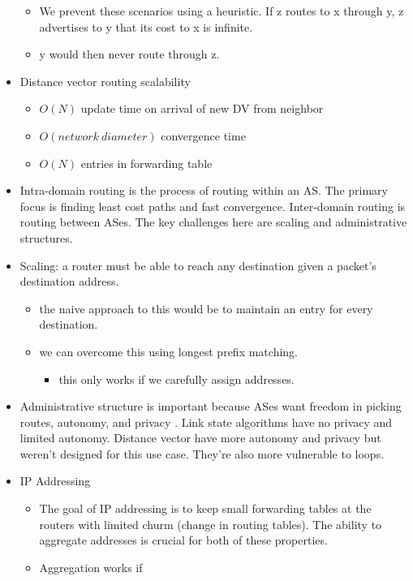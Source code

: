 \begin{itemize}
  \begin{itemize}
  \tightlist
  \item
    We prevent these scenarios using a heuristic. If z routes to x
    through y, z advertises to y that its cost to x is infinite.
  \item
    y would then never route through z.
  \end{itemize}
\item
  Distance vector routing scalability

  \begin{itemize}
  \tightlist
  \item
    \(O(N)\) update time on arrival of new DV from neighbor
  \item
    \(O(network \ diameter)\) convergence time
  \item
    \(O(N)\) entries in forwarding table
  \end{itemize}
\item
  Intra-domain routing is the process of routing within an AS. The
  primary focus is finding least cost paths and fast convergence.
  Inter-domain routing is routing between ASes. The key challenges here
  are scaling and administrative structures.
\item
  Scaling: a router must be able to reach any destination given a
  packet's destination address.

  \begin{itemize}
  \tightlist
  \item
    the naive approach to this would be to maintain an entry for every
    destination.
  \item
    we can overcome this using longest prefix matching.

    \begin{itemize}
    \tightlist
    \item
      this only works if we carefully assign addresses.
    \end{itemize}
  \end{itemize}
\item
  Administrative structure is important because ASes want freedom in
  picking routes, autonomy, and privacy . Link state algorithms have no
  privacy and limited autonomy. Distance vector have more autonomy and
  privacy but weren't designed for this use case. They're also more
  vulnerable to loops.
\item
  IP Addressing

  \begin{itemize}
  \tightlist
  \item
    The goal of IP addressing is to keep small forwarding tables at the
    routers with limited churm (change in routing tables). The ability
    to aggregate addresses is crucial for both of these properties.
  \item
    Aggregation works if


\end{itemize}
\end{itemize}
